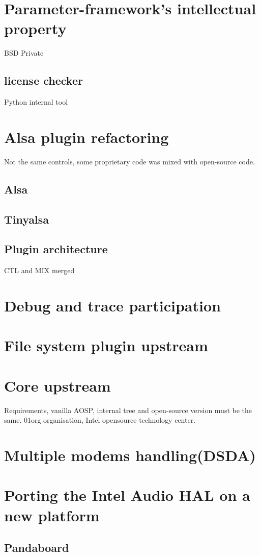 \section{Parameter-framework's intellectual property}
BSD
Private
\subsection{license checker}
Python internal tool

\section{Alsa plugin refactoring}
Not the same controls, some proprietary code was mixed with open-source code.

\subsection{Alsa}
\subsection{Tinyalsa}
\subsection{Plugin architecture}
CTL and MIX merged

\section{Debug and trace participation}

\section{File system plugin upstream}

\section{Core upstream}
Requirements, vanilla AOSP, internal tree and open-source version must be the
same.
01org organisation, Intel opensource technology center.

\section{Multiple modems handling(DSDA)}



\section{Porting the Intel Audio HAL on a new platform}
\subsection{Pandaboard}
